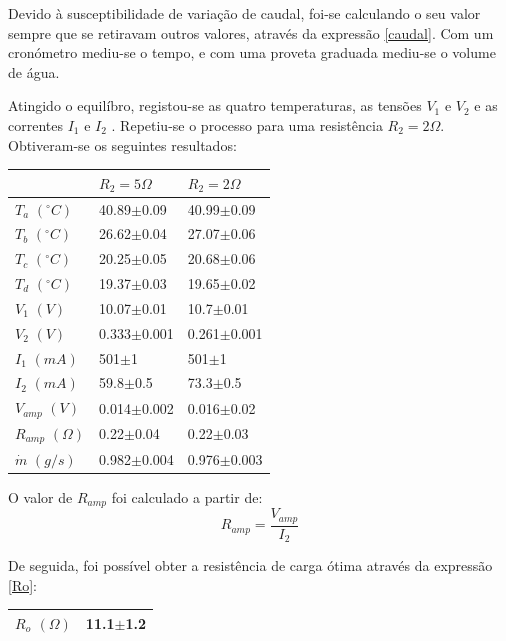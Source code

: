 \documentclass[9pt]{extarticle}
\begin{document}
\begin{multicols}{2}
\par Devido à susceptibilidade de variação de caudal, foi-se calculando o seu valor sempre que se retiravam outros valores, através da expressão \eqref{caudal}. Com um cronómetro mediu-se o tempo, e com uma proveta graduada mediu-se o volume de água.

\par Atingido o equilíbro, registou-se as quatro temperaturas, as tensões $V_1$ e $V_2$ e as correntes $I_1$ e $I_2$ . Repetiu-se o processo para uma resistência $R_2=2\Omega$. Obtiveram-se os seguintes resultados:

{\small
\begin{center}
\begin{tabular}{ x{1.5cm} x{2.2cm} x{2.2cm} }
 & $R_2=5\Omega$ & $R_2=2\Omega$ \tabularnewline
\hline \hline
$T_a$ $(^\circ C)$ & 40.89$\pm$0.09 & 40.99$\pm$0.09 \tabularnewline
$T_b$ $(^\circ C)$ & 26.62$\pm$0.04 & 27.07$\pm$0.06 \tabularnewline
$T_c$ $(^\circ C)$ & 20.25$\pm$0.05 & 20.68$\pm$0.06 \tabularnewline
$T_d$ $(^\circ C)$ & 19.37$\pm$0.03 & 19.65$\pm$0.02 \tabularnewline
$V_1$ $(V)$ & 10.07$\pm$0.01 & 10.7$\pm$0.01 \tabularnewline
$V_2$ $(V)$ & 0.333$\pm$0.001 & 0.261$\pm$0.001 \tabularnewline
$I_1$ $(mA)$ & 501$\pm$1 & 501$\pm$1 \tabularnewline
$I_2$ $(mA)$ & 59.8$\pm$0.5 & 73.3$\pm$0.5 \tabularnewline
$V_{amp}$ $(V)$ & 0.014$\pm$0.002 & 0.016$\pm$0.02 \tabularnewline
$R_{amp}$ $(\Omega)$ & 0.22$\pm$0.04 & 0.22$\pm$0.03 \tabularnewline
$\dot{m}$ $(g/s)$ & 0.982$\pm$0.004 & 0.976$\pm$0.003 \tabularnewline
\end{tabular}
\par{}
\end{center}
}

\par O valor de $R_{amp}$ foi calculado a partir de:
\begin{equation}
R_{amp}=\frac{V_{amp}}{I_2}
\end{equation}

\par De seguida, foi possível obter a resistência de carga ótima através da expressão \eqref{Ro}:

\begin{center}
\begin{tabular}{ x{2cm} x{2cm} }
\hline \hline
$R_o$ $(\Omega)$ & 11.1$\pm$1.2 \tabularnewline
\hline \hline
\end{tabular}
\end{center}


\end{multicols}
\end{document}
